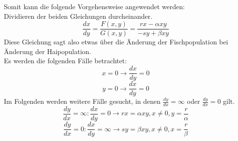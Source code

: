 \documentclass[fontset=ubuntu,12pt,a4paper]{scrreprt}
\begin{document}
Somit kann die folgende Vorgehensweise angewendet werden: \\
Dividieren der beiden Gleichungen durcheinander.
$$\frac{dx}{dy}=\frac{F(x,y)}{G(x,y)}=\frac{rx-\alpha xy}{-sy+\beta xy}$$
Diese Gleichung sagt also etwas über die Änderung der Fischpopulation bei Änderung der Haipopulation.\\
Es werden die folgenden Fälle betrachtet: \\
$$x=0\rightarrow \frac{dx}{dy}=0$$
$$y=0\rightarrow \frac{dx}{dy}=0$$
Im Folgenden werden weitere Fälle gesucht, in denen $\frac{dy}{dx}=\infty$ oder $\frac{dy}{dx}=0$ gilt.
$$\frac{dy}{dx}=\infty: \frac{dx}{dy}=0 \rightarrow rx=\alpha xy, x\neq0, y=\frac{r}{\alpha}$$
$$\frac{dy}{dx}=0: \frac{dx}{dy}=\infty \rightarrow sy=\beta xy, x\neq0, x=\frac{r}{\beta}$$
\end{document}
